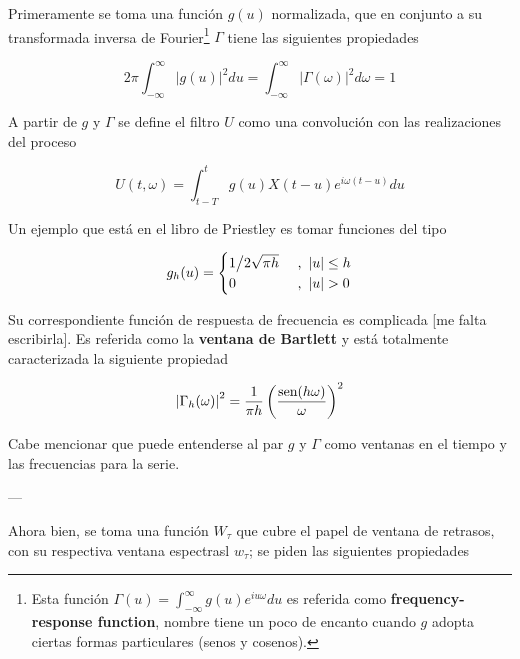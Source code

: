 Primeramente se toma una funci\'on $g(u)$ normalizada, que en conjunto a su
transformada inversa de Fourier\footnote{Esta funci\'on 
$\Gamma(u) = \int_{-\infty}^{\infty} g(u) e^{i u \omega} du$
es referida como
\textbf{frequency-response function}, nombre tiene un poco de encanto cuando
$g$ adopta ciertas formas particulares (senos y cosenos).} 
$\Gamma$ tiene las siguientes propiedades

\begin{equation*}
2\pi \int_{-\infty}^{\infty} \lvert g(u) \lvert^{2} du 
= 
\int_{-\infty}^{\infty} \lvert \Gamma(\omega) \lvert^{2} d\omega
= 1
\end{equation*}


A partir de $g$ y $\Gamma$ se define el filtro $U$ como una convoluci\'on
con las realizaciones del proceso

\begin{equation*}
U(t,\omega) = \int_{t-T}^{t} g(u) X({t-u}) e^{i \omega (t-u)} du
\end{equation*}

Un ejemplo que est\'a en el libro de Priestley es tomar funciones del tipo

\begin{equation*}
g_h(u) = 
\begin{cases}
{1 \big{/} 2\sqrt{\pi h}} & \text{ , } \left| u \right| \leq h
\\
0 & \text{ , } \left| u \right| > 0
\end{cases}
\end{equation*}

Su correspondiente funci\'on de respuesta de frecuencia es complicada [me falta 
escribirla]. Es referida como la \textbf{ventana de Bartlett} y
est\'a totalmente caracterizada la siguiente propiedad

\begin{equation*}
\left| \Gamma_h(\omega) \right|^{2} = \frac{1}{\pi h} \left( \frac{\text{sen} (h \omega)}{\omega} \right)^{2}
\end{equation*}

Cabe mencionar que puede entenderse al par $g$ y $\Gamma$ como ventanas en el tiempo
y las frecuencias para la serie.

---

Ahora bien, se toma una funci\'on $W_\tau$ que cubre el papel de ventana de retrasos,
con su respectiva ventana espectrasl $w_\tau$; se piden las siguientes propiedades


